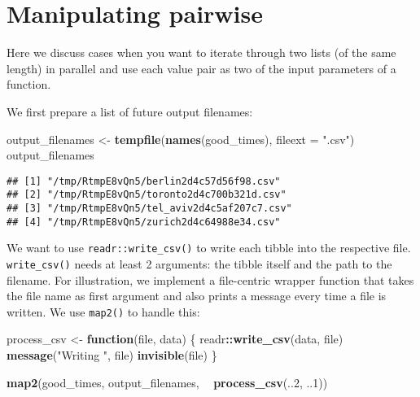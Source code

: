 \documentclass[]{book}
\newenvironment{Shaded}{\begin{snugshade}}{\end{snugshade}}
\newcommand{\ControlFlowTok}[1]{\textcolor[rgb]{0.13,0.29,0.53}{\textbf{#1}}}
\newcommand{\DataTypeTok}[1]{\textcolor[rgb]{0.13,0.29,0.53}{#1}}
\newcommand{\DecValTok}[1]{\textcolor[rgb]{0.00,0.00,0.81}{#1}}
\newcommand{\KeywordTok}[1]{\textcolor[rgb]{0.13,0.29,0.53}{\textbf{#1}}}
\newcommand{\NormalTok}[1]{#1}
\newcommand{\OperatorTok}[1]{\textcolor[rgb]{0.81,0.36,0.00}{\textbf{#1}}}
\newcommand{\StringTok}[1]{\textcolor[rgb]{0.31,0.60,0.02}{#1}}
\begin{document}
\hypertarget{manipulating-pairwise}{%
\section{Manipulating pairwise}\label{manipulating-pairwise}}

Here we discuss cases when you want to iterate through two lists (of the same length) in parallel and use each value pair as two of the input parameters of a function.

We first prepare a list of future output filenames:

\begin{Shaded}
\begin{Highlighting}[]
\NormalTok{output_filenames <-}\StringTok{ }\KeywordTok{tempfile}\NormalTok{(}\KeywordTok{names}\NormalTok{(good_times), }\DataTypeTok{fileext =} \StringTok{".csv"}\NormalTok{)}
\NormalTok{output_filenames}
\end{Highlighting}
\end{Shaded}

\begin{verbatim}
## [1] "/tmp/RtmpE8vQn5/berlin2d4c57d56f98.csv"  
## [2] "/tmp/RtmpE8vQn5/toronto2d4c700b321d.csv" 
## [3] "/tmp/RtmpE8vQn5/tel_aviv2d4c5af207c7.csv"
## [4] "/tmp/RtmpE8vQn5/zurich2d4c64988e34.csv"
\end{verbatim}

We want to use \texttt{readr::write\_csv()} to write each tibble into the respective file.
\texttt{write\_csv()} needs at least 2 arguments: the tibble itself and the path to the filename.
For illustration, we implement a file-centric wrapper function that takes the file name as first argument and also prints a message every time a file is written.
We use \texttt{map2()} to handle this:

\begin{Shaded}
\begin{Highlighting}[]
\NormalTok{process_csv <-}\StringTok{ }\ControlFlowTok{function}\NormalTok{(file, data) \{}
\NormalTok{  readr}\OperatorTok{::}\KeywordTok{write_csv}\NormalTok{(data, file)}
  \KeywordTok{message}\NormalTok{(}\StringTok{"Writing "}\NormalTok{, file)}
  \KeywordTok{invisible}\NormalTok{(file)}
\NormalTok{\}}

\KeywordTok{map2}\NormalTok{(good_times, output_filenames, }\OperatorTok{~}\StringTok{ }\KeywordTok{process_csv}\NormalTok{(..}\DecValTok{2}\NormalTok{, ..}\DecValTok{1}\NormalTok{))}
\end{Highlighting}
\end{Shaded}
\end{document}
